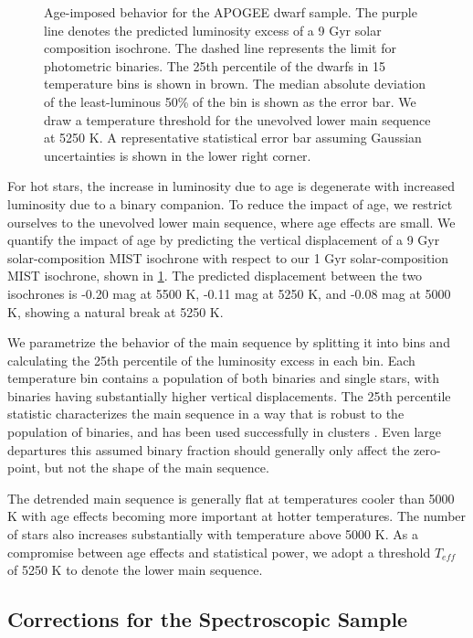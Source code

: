 \documentclass[manuscript]{aastex6}
\newcommand{\Teff}{\ensuremath{T_{eff}}}
\begin{document}
\begin{figure}[htb]
    \centering
    \caption{Age-imposed behavior for the APOGEE dwarf sample. The purple
        line denotes the predicted luminosity excess of a 9 Gyr solar
        composition isochrone. The dashed line represents the limit for 
        photometric binaries. The 25th percentile of the dwarfs in 15 
        temperature bins is shown in brown. The median absolute deviation of
        the least-luminous 50\% of the bin is shown as the error bar. We 
        draw a temperature threshold for the unevolved lower main sequence at 
        5250 K. A representative statistical error bar assuming Gaussian 
        uncertainties is shown in the lower right corner.}
    \label{fig:ages}
\end{figure}

For hot stars, the increase in luminosity due to age is degenerate with
increased luminosity due to a binary companion. To reduce the impact of age,
we restrict ourselves to the unevolved lower main sequence, where age
effects are small. We quantify the impact of age by predicting the vertical
displacement of a 9 Gyr solar-composition MIST isochrone with respect to our 
1 Gyr solar-composition MIST isochrone, shown in \cref{fig:ages}. The
predicted displacement between the two isochrones is -0.20 mag at 5500 K, 
-0.11 mag at 5250 K, and -0.08 mag at 5000 K, showing a natural break at 5250
K.

We parametrize the behavior of the main sequence by splitting it into bins
and calculating the 25th percentile of the luminosity excess in each bin. Each 
temperature bin contains a population of both binaries and single stars, with 
binaries having substantially higher vertical displacements. The 25th 
percentile statistic characterizes the main sequence in a way that is robust 
to the population of binaries, and has been used successfully in clusters 
\citep{An06}. Even large departures this assumed binary fraction should 
generally only affect the zero-point, but not the shape of the main sequence.

The detrended main sequence is generally flat at temperatures cooler than 5000 K 
with age effects becoming more important at hotter temperatures. The number of stars
also increases substantially with temperature above 5000 K. As a compromise
between age effects and statistical power, we adopt a threshold \Teff{} of 
5250 K to denote the lower main sequence.

\subsection{Corrections for the Spectroscopic Sample}
\label{sec:speccor}
\end{document}
